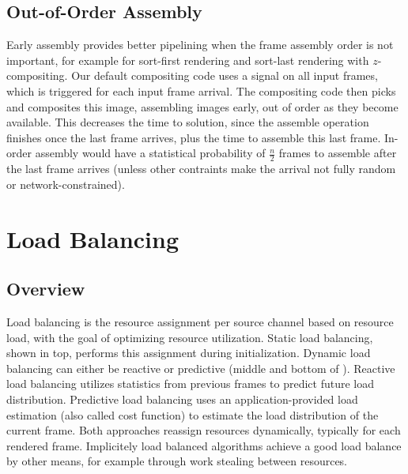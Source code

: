 \section{Out-of-Order Assembly}\label{sEarlyAss}

Early assembly provides better pipelining when the frame assembly order is not
important, for example for sort-first rendering and sort-last rendering with
$z$-compositing. Our default compositing code uses a signal on all input
frames, which is triggered for each input frame arrival. The compositing code
then picks and composites this image, assembling images early, out of order as
they become available. This decreases the time to solution, since the assemble
operation finishes once the last frame arrives, plus the time to assemble this
last frame. In-order assembly would have a statistical probability of
$\frac{n}{2}$ frames to assemble after the last frame arrives (unless other
contraints make the arrival not fully random or network-constrained).

\chapter{Load Balancing}\label{sLoadBalancing}

\section{Overview}

Load balancing is the resource assignment per source channel based on resource
load, with the goal of optimizing resource utilization. Static load balancing,
shown in  top, performs this assignment during
initialization. Dynamic load balancing can either be reactive or predictive
(middle and bottom of ). Reactive load balancing utilizes
statistics from previous frames to predict future load distribution. Predictive
load balancing uses an application-provided load estimation (also called cost
function) to estimate the load distribution of the current frame. Both
approaches reassign resources dynamically, typically for each rendered frame.
Implicitely load balanced algorithms achieve a good load balance by other
means, for example through work stealing between resources.

